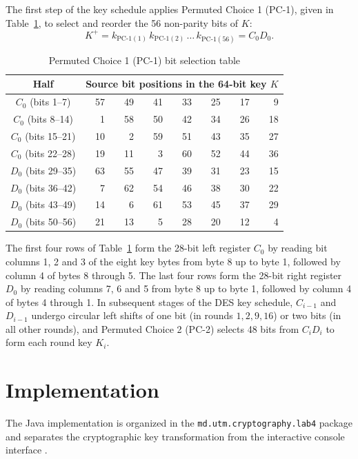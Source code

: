 \documentclass{utmreport}
\begin{document}
The first step of the key schedule applies Permuted Choice 1 (PC-1), given in Table~\ref{tab:pc1}, to select and reorder the 56 non-parity bits of $K$:
\begin{equation}
K^+ = k_{\text{PC-1}(1)}\,k_{\text{PC-1}(2)}\,\ldots\,k_{\text{PC-1}(56)} = C_0 D_0.
\end{equation}
\begin{table}[!htbp]
\caption{Permuted Choice 1 (PC-1) bit selection table}
\label{tab:pc1}\centering
\begin{tabular}{crrrrrrr}\hline
Half & \multicolumn{7}{c}{Source bit positions in the 64-bit key $K$}\\\hline
$C_0$ (bits 1--7)   & 57 & 49 & 41 & 33 & 25 & 17 &  9\\
$C_0$ (bits 8--14)  &  1 & 58 & 50 & 42 & 34 & 26 & 18\\
$C_0$ (bits 15--21) & 10 &  2 & 59 & 51 & 43 & 35 & 27\\
$C_0$ (bits 22--28) & 19 & 11 &  3 & 60 & 52 & 44 & 36\\\hline
$D_0$ (bits 29--35) & 63 & 55 & 47 & 39 & 31 & 23 & 15\\
$D_0$ (bits 36--42) &  7 & 62 & 54 & 46 & 38 & 30 & 22\\
$D_0$ (bits 43--49) & 14 &  6 & 61 & 53 & 45 & 37 & 29\\
$D_0$ (bits 50--56) & 21 & 13 &  5 & 28 & 20 & 12 &  4\\\hline
\end{tabular}
\end{table}

The first four rows of Table~\ref{tab:pc1} form the 28-bit left register $C_0$ by reading bit columns 1, 2 and 3 of the eight key bytes from byte 8 up to byte 1, followed by column 4 of bytes 8 through 5. The last four rows form the 28-bit right register $D_0$ by reading columns 7, 6 and 5 from byte 8 up to byte 1, followed by column 4 of bytes 4 through 1. In subsequent stages of the DES key schedule, $C_{i-1}$ and $D_{i-1}$ undergo circular left shifts of one bit (in rounds $1,2,9,16$) or two bits (in all other rounds), and Permuted Choice 2 (PC-2) selects 48 bits from $C_iD_i$ to form each round key $K_i$.

\chapter{Implementation}
The Java implementation is organized in the \texttt{md.utm.cryptography.lab4} package and separates the cryptographic key transformation from the interactive console interface \cite{repo}.
\end{document}
